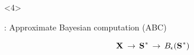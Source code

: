 \begin{frame}[t]
    \vspace{1mm}
    \begin{uncoverenv}<4>
        \begin{center}
            \msb: Approximate Bayesian computation (ABC)

            \vspace{-5mm}
            \[ \alignmentVector \, \to \, \ssVectorObs \, \to \, \ssSpace\]
        \end{center}
    \end{uncoverenv}
\end{frame}

